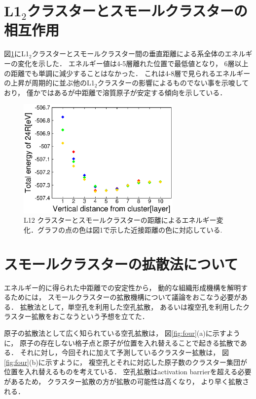 \documentclass[a4j,twocolumn]{jsarticle}
\begin{document}
\section{L1$_2$クラスターとスモールクラスターの相互作用}

図\ref{fig:three}にL1$_2$クラスターとスモールクラスター間の垂直距離による系全体のエネルギーの変化を示した．
エネルギー値は4-5層離れた位置で最低値となり，
6層以上の距離でも単調に減少することはなかった．
これは4-8層で見られるエネルギーの上昇が周期的に並ぶ他のL1$_2$クラスターの影響によるものでない事を示唆しており，
僅かではあるが中距離で溶質原子が安定する傾向を示している．

\begin{figure}[H]
\begin{center}
   \includegraphics[width=80mm]{./smallcluster_Alld_JPS2017.eps}
  \caption{L1$2$ クラスターとスモールクラスターの距離によるエネルギー変化．グラフの点の色は図1で示した近接距離の色に対応している.}
  \label{fig:three}
\end{center}
\end{figure}

\vspace{-1.0\baselineskip}

\section{スモールクラスターの拡散法について}
エネルギー的に得られた中距離での安定性から，
動的な組織形成機構を解明するためには，
スモールクラスターの拡散機構について議論をおこなう必要がある．
拡散法として，単空孔を利用した空孔拡散，
あるいは複空孔を利用したクラスター拡散をおこなうという予想を立てた．

原子の拡散法として広く知られている空孔拡散は，
図\ref{fig:four}(a)に示すように，
原子の存在しない格子点と原子が位置を入れ替えることで起きる拡散である．
それに対し，今回それに加えて予測しているクラスター拡散は，
図\ref{fig:four}(b)に示すように，
複空孔とそれに対応した原子数のクラスター集団が位置を入れ替えるものを考えている．
空孔拡散はactivation barrierを超える必要があるため，
クラスター拡散の方が拡散の可能性は高くなり，
より早く拡散される．
\end{document}
